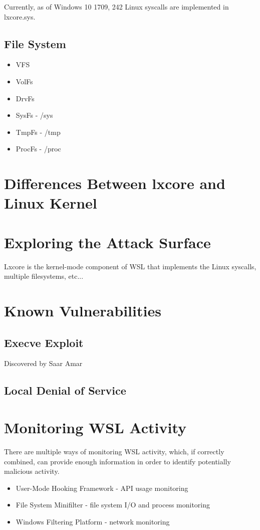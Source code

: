 \documentclass[conference]{IEEEtran}
\begin{document}
    Currently, as of Windows 10 1709, 242 Linux syscalls are implemented in lxcore.sys.

\subsection{File System}

\begin{itemize}
    \item VFS
    \item VolFs
    \item DrvFs
    \item SysFs - /sys
    \item TmpFs - /tmp 
    \item ProcFs - /proc
\end{itemize}


\section{Differences Between lxcore and Linux Kernel}

\section{Exploring the Attack Surface}
Lxcore is the kernel-mode component of WSL that implements the Linux syscalls, multiple filesystems, etc...

\section{Known Vulnerabilities}
\subsection{Execve Exploit}
Discovered by Saar Amar

\subsection{Local Denial of Service}


\section{Monitoring WSL Activity}

There are multiple ways of monitoring WSL activity, which, if correctly combined, can provide enough information in order to identify
potentially malicious activity.

\begin{itemize}
    \item User-Mode Hooking Framework - API usage monitoring
    \item File System Minifilter - file system I/O and process monitoring
    \item Windows Filtering Platform - network monitoring    
\end{itemize}
\end{document}

